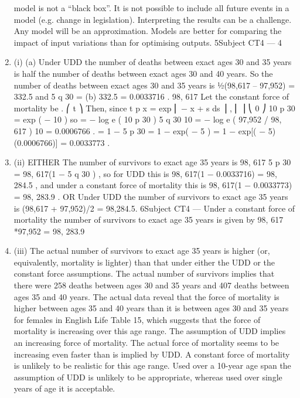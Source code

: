 \documentclass[a4paper,12pt]{article}
\begin{document}
\begin{enumerate}
model is not a “black box”.
It is not possible to include all future events in a model (e.g. change in legislation).
Interpreting the results can be a challenge.
Any model will be an approximation.
Models are better for comparing the impact of input variations than for optimising
outputs.
5Subject CT4 — %
4
\item (i)
(a)
Under UDD the number of deaths between exact ages 30 and 35 years
is half the number of deaths between exact ages 30 and 40 years.
So the number of deaths between exact ages 30 and 35 years is
1⁄2(98,617 – 97,952) = 332.5
and 5 q 30 =
(b)
332.5
= 0.0033716 .
98, 617
Let the constant force of mortality be \mu.
⎛ t
⎞
Then, since t p x = exp ⎜ − \int \mu x + s ds ⎟ ,
⎜
⎟
⎝ 0
⎠
10 p 30 = exp ( − 10 \mu )
so
\mu=
− log e ( 10 p 30 )
5 q 30
10
=
− log e ( 97,952 / 98, 617 )
10
= 0.0006766 .
= 1 − 5 p 30 = 1 − exp( − 5 \mu )
= 1 − exp[( − 5)(0.0006766)] = 0.0033773 .
\item (ii)
EITHER
The number of survivors to exact age 35 years is
98, 617 5 p 30 = 98, 617(1 − 5 q 30 ) ,
so for UDD this is
98, 617(1 − 0.0033716) = 98, 284.5 ,
and under a constant force of mortality this is
98, 617(1 − 0.0033773) = 98, 283.9 .
OR
Under UDD the number of survivors to exact age 35 years is
(98,617 + 97,952)/2 = 98,284.5.
6Subject CT4 — %
Under a constant force of mortality the number of survivors to
exact age 35 years is given by
98, 617 *97,952 = 98, 283.9
\item (iii)
The actual number of survivors to exact age 35 years is higher (or,
equivalently, mortality is lighter) than that under either the UDD or the
constant force assumptions.
The actual number of survivors implies that there were 258 deaths between
ages 30 and 35 years and 407 deaths between ages 35 and 40 years.
The actual data reveal that the force of mortality is higher between ages 35 and
40 years than it is between ages 30 and 35 years for females in English Life
Table 15, which suggests that the force of mortality is increasing over this age
range.
The assumption of UDD implies an increasing force of mortality.
The actual force of mortality seems to be increasing even faster than is implied
by UDD.
A constant force of mortality is unlikely to be realistic for this age range.
Used over a 10-year age span the assumption of UDD is unlikely to be
appropriate, whereas used over single years of age it is acceptable.



\end{enumerate}
\end{document}
